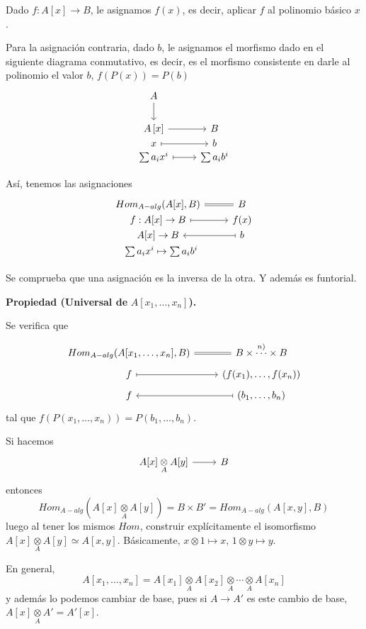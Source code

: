 \begin{dem}
    Dado $f:A[x] \longrightarrow B$, le asignamos $f(x)$, es decir, aplicar $f$ al polinomio b\'asico $x$.

    Para la asignaci\'on contraria, dado $b$, le asignamos el morfismo dado en el siguiente diagrama conmutativo, es decir, es el morfismo consistente en darle al polinomio el valor $b$, $f(P(x)) = P(b)$
    $$\bt A \arrow{d} \\ A\left[x\right] \arrow{r} & B \\[-7mm] x \arrow[mapsto]{r} & b  \\[-7mm] \sum a_i x^i \arrow[mapsto]{r} & \sum a_i b^i \et$$
    
    As\'i, tenemos las asignaciones
    $$\bt Hom_{A-alg} (A[x],B) \arrow[equal]{r} & B \\[-7mm] f :A[x] \to B \arrow[mapsto]{r} & f(x) \\[-7mm] A[x] \to B & \arrow[mapsto]{l} b \\[-7mm] \, \, \, \, \sum a_ix^i \mapsto \sum a_ib^i \et$$

    Se comprueba que una asignaci\'on es la inversa de la otra. Y adem\'as es funtorial.
\end{dem}
\noindent \textbf{Propiedad (Universal de }$A\left[x_1, \ldots,x_n\right]$\textbf{).}
   
    Se verifica que
    $$\bt Hom_{A-alg} (A[x_1, \ldots,x_n],B) \arrow[equal]{r} & B\times \overset{n)}{\cdots} \times B \\[-5mm] f \arrow[mapsto]{r} & (f(x_1),\ldots, f(x_n))\\[-5mm] f & \arrow[mapsto]{l} (b_1,\ldots, b_n)\et$$
    tal que $f(P(x_1, \ldots, x_n)) = P(b_1, \ldots, b_n)$. 
\begin{ejer}
    Si hacemos 
    $$\bt A[x] \underset{A}{\otimes} A[y] \arrow{r} & B \et$$
    entonces 
    $$Hom_{A-alg} (A[x] \underset{A}{\otimes} A[y]) = B \times B ' = Hom_{A-alg} (A[x,y],B)$$
    luego al tener los mismos $Hom$, construir expl\'icitamente el isomorfismo $A[x] \underset{A}{\otimes} A[y] \simeq A[x,y]$. B\'asicamente, $x\otimes 1 \longmapsto x, \, 1 \otimes y \longmapsto y$. 

    En general, 
    $$A[x_1,\ldots,x_n] = A[x_1] \underset{A}{\otimes} A[x_2] \underset{A}{\otimes} \cdots \underset{A}{\otimes} A[x_n]$$
    y adem\'as lo podemos cambiar de base, pues si $A \longrightarrow A'$ es este cambio de base, $A[x]\underset{A}{\otimes} A' = A'[x]$. 
\end{ejer}
